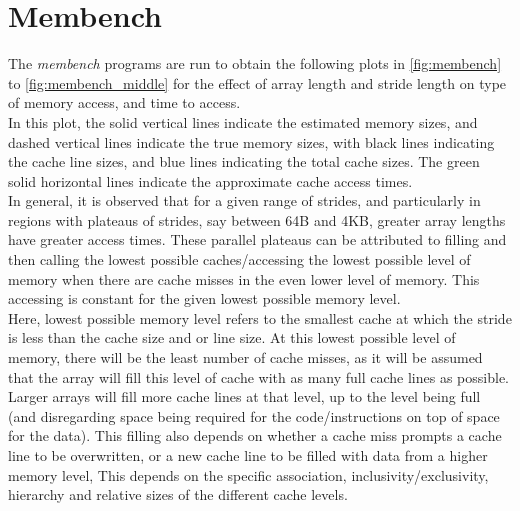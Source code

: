 \documentclass[letterpaper]{article}
\title{\large \doctitle}
\author{}
\date{}%
\begin{document}
\maketitle
\pagestyle{fancy}




\section{Membench}
The \textit{membench} programs are run to obtain the following plots in \cref{fig:membench} to \cref{fig:membench_middle} for the effect of array length and stride length on type of memory access, and time to access. \\ 

In this plot, the solid vertical lines indicate the estimated memory sizes, and dashed vertical lines indicate the true memory sizes, with black lines indicating the cache line sizes, and blue lines indicating the total cache sizes. The green solid horizontal lines indicate the approximate cache access times. \\

In general, it is observed that for a given range of strides, and particularly in regions with plateaus of strides, say between 64B and 4KB, greater array lengths have greater access times. These parallel plateaus can be attributed to filling and then calling the lowest possible caches/accessing the lowest possible level of memory when there are cache misses in the even lower level of memory. This accessing is constant for the given lowest possible memory level. \\

Here, lowest possible memory level refers to the smallest cache at which the stride is less than the cache size and or line size. At this lowest possible level of memory, there will be the least number of cache misses, as it will be assumed that the array will fill this level of cache with as many full cache lines as possible. Larger arrays will fill more cache lines at that level, up to the level being full (and disregarding space being required for the code/instructions on top of space for the data). This filling also depends on whether a cache miss prompts a cache line to be overwritten, or a new cache line to be filled with data from a higher memory level, This depends on the specific association, inclusivity/exclusivity, hierarchy and relative sizes of the different cache levels. \\
\end{document}
